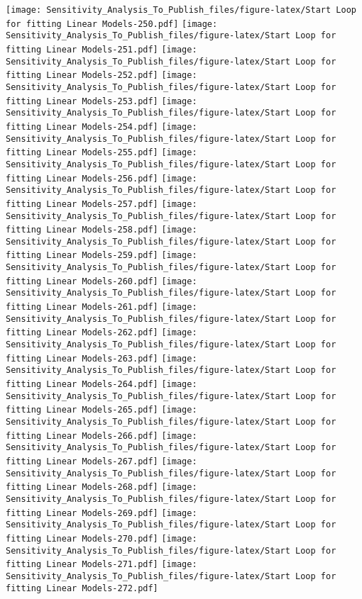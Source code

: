 \documentclass[
]{article}
\begin{document}
\texttt{[image: Sensitivity\_Analysis\_To\_Publish\_files/figure-latex/Start Loop for fitting Linear Models-250.pdf]}
\texttt{[image: Sensitivity\_Analysis\_To\_Publish\_files/figure-latex/Start Loop for fitting Linear Models-251.pdf]}
\texttt{[image: Sensitivity\_Analysis\_To\_Publish\_files/figure-latex/Start Loop for fitting Linear Models-252.pdf]}
\texttt{[image: Sensitivity\_Analysis\_To\_Publish\_files/figure-latex/Start Loop for fitting Linear Models-253.pdf]}
\texttt{[image: Sensitivity\_Analysis\_To\_Publish\_files/figure-latex/Start Loop for fitting Linear Models-254.pdf]}
\texttt{[image: Sensitivity\_Analysis\_To\_Publish\_files/figure-latex/Start Loop for fitting Linear Models-255.pdf]}
\texttt{[image: Sensitivity\_Analysis\_To\_Publish\_files/figure-latex/Start Loop for fitting Linear Models-256.pdf]}
\texttt{[image: Sensitivity\_Analysis\_To\_Publish\_files/figure-latex/Start Loop for fitting Linear Models-257.pdf]}
\texttt{[image: Sensitivity\_Analysis\_To\_Publish\_files/figure-latex/Start Loop for fitting Linear Models-258.pdf]}
\texttt{[image: Sensitivity\_Analysis\_To\_Publish\_files/figure-latex/Start Loop for fitting Linear Models-259.pdf]}
\texttt{[image: Sensitivity\_Analysis\_To\_Publish\_files/figure-latex/Start Loop for fitting Linear Models-260.pdf]}
\texttt{[image: Sensitivity\_Analysis\_To\_Publish\_files/figure-latex/Start Loop for fitting Linear Models-261.pdf]}
\texttt{[image: Sensitivity\_Analysis\_To\_Publish\_files/figure-latex/Start Loop for fitting Linear Models-262.pdf]}
\texttt{[image: Sensitivity\_Analysis\_To\_Publish\_files/figure-latex/Start Loop for fitting Linear Models-263.pdf]}
\texttt{[image: Sensitivity\_Analysis\_To\_Publish\_files/figure-latex/Start Loop for fitting Linear Models-264.pdf]}
\texttt{[image: Sensitivity\_Analysis\_To\_Publish\_files/figure-latex/Start Loop for fitting Linear Models-265.pdf]}
\texttt{[image: Sensitivity\_Analysis\_To\_Publish\_files/figure-latex/Start Loop for fitting Linear Models-266.pdf]}
\texttt{[image: Sensitivity\_Analysis\_To\_Publish\_files/figure-latex/Start Loop for fitting Linear Models-267.pdf]}
\texttt{[image: Sensitivity\_Analysis\_To\_Publish\_files/figure-latex/Start Loop for fitting Linear Models-268.pdf]}
\texttt{[image: Sensitivity\_Analysis\_To\_Publish\_files/figure-latex/Start Loop for fitting Linear Models-269.pdf]}
\texttt{[image: Sensitivity\_Analysis\_To\_Publish\_files/figure-latex/Start Loop for fitting Linear Models-270.pdf]}
\texttt{[image: Sensitivity\_Analysis\_To\_Publish\_files/figure-latex/Start Loop for fitting Linear Models-271.pdf]}
\texttt{[image: Sensitivity\_Analysis\_To\_Publish\_files/figure-latex/Start Loop for fitting Linear Models-272.pdf]}
\end{document}
